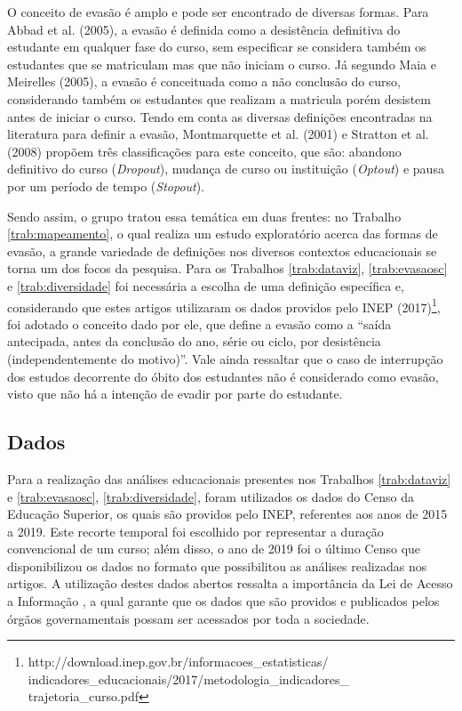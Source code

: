 \documentclass[12pt]{article}
\begin{document}
O conceito de evasão é amplo e pode ser encontrado de diversas formas. Para Abbad et al. (2005)\nocite{abbad:2005}, a evasão é definida como a desistência definitiva do estudante em qualquer fase do curso, sem especificar se considera também os estudantes que se matriculam mas que não iniciam o curso. Já segundo Maia e Meirelles (2005)\nocite{maia:2005}, a evasão é conceituada como a não conclusão do curso, considerando também os estudantes que realizam a matricula porém desistem antes de iniciar o curso. Tendo em conta as diversas definições encontradas na literatura para definir a evasão, Montmarquette et al. (2001)\nocite{montmarquette:2001} e Stratton et al. (2008)\nocite{stratton:2008} propõem três classificações para este conceito, que são: abandono definitivo do curso (\textit{Dropout}), mudança de curso ou instituição (\textit{Optout}) e pausa por um período de tempo (\textit{Stopout}).

Sendo assim, o grupo tratou essa temática em duas frentes: no Trabalho \ref{trab:mapeamento}, o qual realiza um estudo exploratório acerca das formas de evasão, a grande variedade de definições nos diversos contextos educacionais se torna um dos focos da pesquisa. Para os Trabalhos \ref{trab:dataviz}, \ref{trab:evasaosc} e \ref{trab:diversidade} foi necessária a escolha de uma definição específica e, considerando que estes artigos utilizaram os dados providos pelo INEP (2017)\footnote{http://download.inep.gov.br/informacoes\_estatisticas/
indicadores\_educacionais/2017/metodologia\_indicadores\_
trajetoria\_curso.pdf}, foi adotado o conceito dado por ele, que define a evasão como a ``saída antecipada, antes da conclusão do ano, série ou ciclo, por desistência (independentemente do motivo)''. Vale ainda ressaltar que o caso de interrupção dos estudos decorrente do óbito dos estudantes não é considerado como evasão, visto que não há a intenção de evadir por parte do estudante. %

\subsection{Dados}
\label{subsec:dados}

Para a realização das análises educacionais presentes nos Trabalhos \ref{trab:dataviz} e \ref{trab:evasaosc}, \ref{trab:diversidade}, foram utilizados os dados do Censo da Educação Superior, os quais são providos pelo INEP, referentes aos anos de 2015 a 2019. Este recorte temporal foi escolhido por representar a duração convencional de um curso; além disso, o ano de 2019 foi o último Censo que disponibilizou os dados no formato que possibilitou as análises realizadas nos artigos. A utilização destes dados abertos ressalta a importância da Lei de Acesso a Informação \cite{LAI:2011}, a qual garante que os dados que são providos e publicados pelos órgãos governamentais possam ser acessados por toda a sociedade. 
\end{document}
